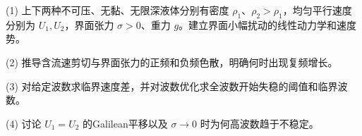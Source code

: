 (1) 上下两种不可压、无黏、无限深液体分别有密度 \(\rho_1\)、\(\rho_2>\rho_1\)，均匀平行速度分别为 \(U_1,U_2\)，界面张力 \(\sigma>0\)、重力 \(g\)。建立界面小幅扰动的线性动力学和速度势。

(2) 推导含流速剪切与界面张力的正频和负频色散，明确何时出现复频增长。

(3) 对给定波数求临界速度差，并对波数优化求全波数开始失稳的阈值和临界波数。

(4) 讨论 \(U_1=U_2\) 的Galilean平移以及 \(\sigma\to0\) 时为何高波数趋于不稳定。

